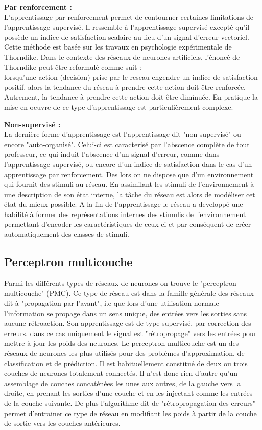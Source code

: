 \documentclass{article}
\begin{document}
\textbf{Par renforcement :}\\
L’apprentissage par renforcement permet de contourner certaines limitations de l’apprentissage supervisé. Il ressemble à l’apprentissage supervisé excepté qu’il possède un indice de satisfaction scalaire au lieu d’un signal d’erreur vectoriel. Cette méthode est basée sur les travaux en psychologie expérimentale de Thorndike. Dans le contexte des réseaux de neurones artificiels, l’énoncé de Thorndike peut être reformulé comme suit :\\
lorsqu’une action (decision) prise par le reseau engendre un indice de satisfaction positif, alors la tendance du réseau à prendre cette action doit être renforcée. Autrement, la tendance à prendre cette action doit être diminuée. En pratique la mise en oeuvre de ce type d’apprentissage est particulièrement complexe.


\textbf{Non-supervisé :}\\
La dernière forme d’apprentissage est l’apprentissage dit "non-supervisé" ou encore "auto-organisé". Celui-ci est caracterisé par l’abscence complète de tout professeur, ce qui induit l’abscence d’un signal d’erreur, comme dans l’apprentissage supervisé, ou encore d’un indice de satisfaction dans le cas d’un apprentissage par renforcement. 
Des lors on ne dispose que d’un environnement qui fournit des stimuli au réseau. En assimilant les stimuli de l’environnement à une description de son état interne, la tâche du réseau est alors de modéliser cet état du mieux possible. A la fin de l’apprentissage le réseau a developpé une habilité à former des représentations internes des stimulis de l’environnement permettant d’encoder les caractéristiques de ceux-ci et par conséquent de créer automatiquement des classes de stimuli.


                \subsection{Perceptron multicouche}
Parmi les différents types de réseaux de neurones on trouve le "perceptron multicouche" (PMC). Ce type de réseau est dans la famille générale des réseaux dit à "propagation par l’avant", i.e que lors d’une utilisation normale l’information se propage dans un sens unique, des entrées vers les sorties sans aucune rétroaction. Son apprentissage est de type supervisé, par correction des erreurs. dans ce cas uniquement le signal est "rétropropage" vers les entrées pour mettre à jour les poids des neurones. Le perceptron multicouche est un des réseaux de neurones les plus utilisés pour des problèmes d’approximation, de classification et de prédiction. Il est habituellement constitué de deux ou trois couches de neurones totalement connectés. Il n’est donc rien d’autre qu’un assemblage de couches concaténées les unes aux autres, de la gauche vers la droite, en prenant les sorties d’une couche et en les injectant comme les entrées de la couche suivante. De plus l’algorithme dit de "rétropropagation des erreurs" permet d’entrainer ce type de réseau en modifiant les poids à partir de la couche de sortie vers les couches antérieures.
\end{document}
